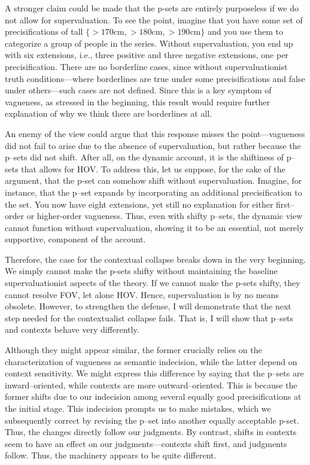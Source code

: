 A stronger claim could be made that the p-sets are entirely purposeless
if we do not allow for supervaluation. To see the point, imagine that
you have some set of precisifications of tall $\{>170\text{cm},
>180\text{cm}, >190\text{cm}\}$ and you use them to categorize a
group of people in the series. Without supervaluation, you end up with
six extensions, i.e., three positive and three negative extensions, one
per precisification. There are no borderline cases, since without
supervaluationist truth conditions---where borderlines are true under
some precisifications and false under others---such cases are not
defined. Since this is a key symptom of vagueness, as stressed in the
beginning, this result would require further explanation of why we think
there are borderlines at all.

An enemy of the view could argue that this response misses the point---vagueness did not fail to arise due to the absence of supervaluation,
but rather because the p--sets did not shift. After all, on the dynamic
account, it is the shiftiness of p--sets that allows for HOV. To address
this, let us suppose, for the sake of the argument, that the p-set can
somehow shift without supervaluation. Imagine, for instance, that the
p--set expands by incorporating an additional precisification to the set.
You now have eight extensions, yet still no explanation for either
first--order or higher-order vagueness. Thus, even with shifty p--sets,
the dynamic view cannot function without supervaluation, showing it to
be an essential, not merely supportive, component of the account.

Therefore, the case for the contextual collapse breaks down in the very
beginning. We simply cannot make the p-sets shifty without maintaining
the baseline supervaluationist aspects of the theory. If we cannot make
the p-sets shifty, they cannot resolve FOV, let alone HOV. Hence,
supervaluation is by no means obsolete. However, to strengthen the
defense, I will demonstrate that the next step needed for the
contextualist collapse fails. That is, I will show that p--sets and
contexts behave very differently.

Although they might appear similar, the former crucially relies on the
characterization of vagueness as semantic indecision, while the latter
depend on context sensitivity. We might express this difference by
saying that the p--sets are inward--oriented, while contexts are more
outward--oriented. This is because the former shifts due to our
indecision among several equally good precisifications at the initial
stage. This indecision prompts us to make mistakes, which we
subsequently correct by revising the p--set into another equally
acceptable p-set. Thus, the changes directly follow our judgments. By
contrast, shifts in contexts seem to have an effect on our judgments---contexts shift first, and judgments follow. Thus, the machinery appears
to be quite different.

